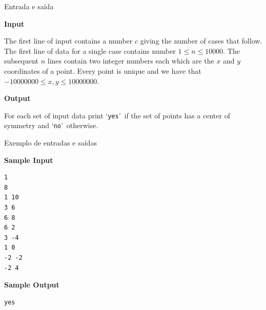 \begin{frame}[fragile]{Entrada e saída}

\textbf{Input}

The first line of input contains a number $c$ giving the
number of cases that follow. The first line of data for
a single case contains number $1 \leq n \leq 10000$. The
subsequent $n$ lines contain two integer numbers each
which are the $x$ and $y$ coordinates of a point. Every
point is unique and we have that $-10000000 \leq x, y \leq
10000000$.

\textbf{Output}

For each set of input data print \lq\texttt{yes}\rq\ if the set of
points has a center of symmetry and \lq\texttt{no}\rq\ otherwise.

\end{frame}

\begin{frame}[fragile]{Exemplo de entradas e saídas}

\begin{minipage}[t]{0.5\textwidth}
\textbf{Sample Input}
\begin{verbatim}
1
8
1 10
3 6
6 8
6 2
3 -4
1 0
-2 -2
-2 4
\end{verbatim}
\end{minipage}
\begin{minipage}[t]{0.45\textwidth}
\textbf{Sample Output}
\begin{verbatim}
yes
\end{verbatim}
\end{minipage}
\end{frame}

